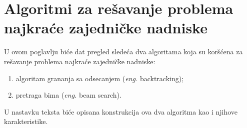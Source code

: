 \documentclass[12pt,oneside]{memoir}
\begin{document}

\chapter{Algoritmi za rešavanje problema najkraće zajedničke nadniske}
U ovom poglavlju biće dat pregled sledeća dva algoritama koja su koršćena za rešavanje problema najkraće zajedničke
nadniske:
\label{chap:algoritmi}

\begin{enumerate}
  \item algoritam grananja sa odsecanjem (\textit{eng.} backtracking);
  \item pretraga bima (\textit{eng.} beam search).
\end{enumerate}
U nastavku teksta biće opisana konstrukcija ova dva algoritma kao i njihove karakteristike.
\end{document}
